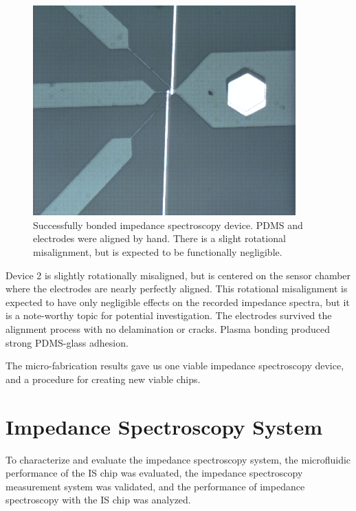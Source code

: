 \begin{figure}[h]
    \centering
    \includegraphics[width=0.9\textwidth]{images/good_device.png}
    \caption[Succefully bonded IS device]{Successfully bonded impedance spectroscopy device. PDMS and electrodes were aligned by hand. There is a slight rotational misalignment, but is expected to be functionally negligible.}
    \label{fig:good_device}
\end{figure} 

\par Device 2 is slightly rotationally misaligned, but is centered on the sensor chamber where the electrodes are nearly perfectly aligned. This rotational misalignment is expected to have only negligible effects on the recorded impedance spectra, but it is a note-worthy topic for potential investigation. The electrodes survived the alignment process with no delamination or cracks. Plasma bonding produced strong PDMS-glass adhesion. 

\par The micro-fabrication results gave us one viable impedance spectroscopy device, and a procedure for creating new viable chips.

\FloatBarrier

\section{Impedance Spectroscopy System}

\par To characterize and evaluate the impedance spectroscopy system, the microfluidic performance of the IS chip was evaluated, the impedance spectroscopy measurement system was validated, and the performance of impedance spectroscopy with the IS chip was analyzed. 

